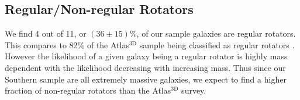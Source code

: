 \documentclass[a4paper,fleqn,usenatbib]{mnras}
\begin{document}
\begin{table}
\begin{tabular}{l c c c c c c c}
		\end{tabular}
	\end{table}

	\subsection{Regular/Non-regular Rotators}
		\label{subsec:RR}
		We find 4 out of 11, or $(36\pm15)$\%, of our sample galaxies are regular rotators. This compares to 82\% of the Atlas$^\text{3D}$ sample being classified as regular rotators \citep{Krajnovic2011}. However the likelihood of a given galaxy being a regular rotator is highly mass dependent with the likelihood decreasing with increasing mass. Thus since our Southern sample are all extremely massive galaxies, we expect to find a higher fraction of non-regular rotators than the Atlas$^\text{3D}$ survey.
	
\end{document}

